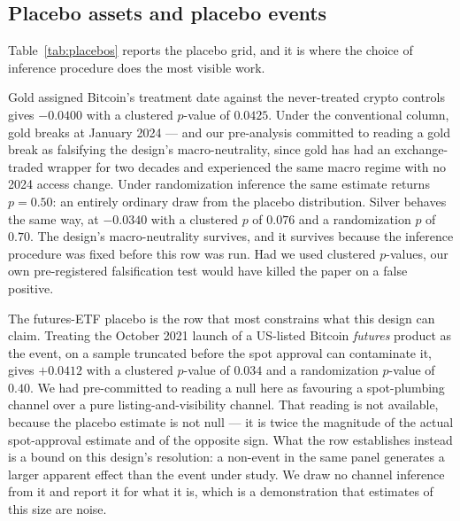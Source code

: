 \documentclass[12pt,a4paper]{article}
\begin{document}
\subsection{Placebo assets and placebo events}

Table~\ref{tab:placebos} reports the placebo grid, and it is where the choice of inference procedure does the most visible work.



Gold assigned Bitcoin's treatment date against the never-treated crypto controls gives
$-0.0400$ with a clustered $p$-value of $0.0425$. Under the conventional column, gold breaks at January 2024 — and our pre-analysis committed to reading a gold break as falsifying the design's macro-neutrality, since gold has had an exchange-traded wrapper for two decades and experienced the same macro regime with no 2024 access change. Under randomization inference the same estimate returns
$p = 0.50$: an entirely ordinary draw from the placebo distribution. Silver behaves the same way, at
$-0.0340$ with a clustered $p$ of
$0.076$ and a randomization $p$ of
$0.70$. The design's macro-neutrality survives, and it survives because the inference procedure was fixed before this row was run. Had we used clustered $p$-values, our own pre-registered falsification test would have killed the paper on a false positive.

The futures-ETF placebo is the row that most constrains what this design can claim. Treating the October 2021 launch of a US-listed Bitcoin \emph{futures} product as the event, on a sample truncated before the spot approval can contaminate it, gives
$+0.0412$ with a clustered $p$-value of
$0.034$ and a randomization $p$-value of
$0.40$. We had pre-committed to reading a null here as favouring a spot-plumbing channel over a pure listing-and-visibility channel. That reading is not available, because the placebo estimate is not null — it is twice the magnitude of the actual spot-approval estimate and of the opposite sign. What the row establishes instead is a bound on this design's resolution: a non-event in the same panel generates a larger apparent effect than the event under study. We draw no channel inference from it and report it for what it is, which is a demonstration that estimates of this size are noise.
\end{document}
